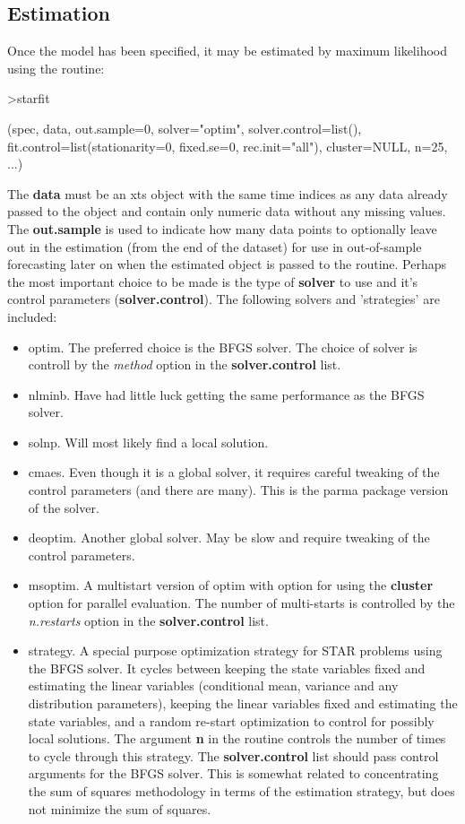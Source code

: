 \subsection{Estimation}
Once the model has been specified, it may be estimated by maximum likelihood
using the  routine:
\begin{Schunk}
\begin{Sinput}
>starfit
\end{Sinput}
\begin{Soutput}
(spec, data, out.sample=0, solver="optim", solver.control=list(), 
fit.control=list(stationarity=0, fixed.se=0, rec.init="all"), 
cluster=NULL, n=25, ...)
\end{Soutput}
\end{Schunk}
The \textbf{data} must be an xts object with the same time indices as any data
already passed to the  object and contain only numeric data
without any missing values. The \textbf{out.sample} is used to indicate how many
data points to optionally leave out in the estimation (from the end of the
dataset) for use in out-of-sample forecasting later on when the estimated object
is passed to the  routine. Perhaps the most important choice
to be made is the type of \textbf{solver} to use and it's control parameters
(\textbf{solver.control}). The following solvers and 'strategies' are included:
\begin{itemize}
  \item optim. The preferred choice is the BFGS solver. The choice of solver is
  controll by the \emph{method} option in the \textbf{solver.control} list.
  \item nlminb. Have had little luck getting the same performance as the BFGS
  solver.
  \item solnp. Will most likely find a local solution.
  \item cmaes. Even though it is a global solver, it requires careful tweaking
  of the control parameters (and there are many). This is the parma package
  version of the solver.
  \item deoptim. Another global solver. May be slow and require tweaking of the
  control parameters.
  \item msoptim. A multistart version of optim with option for using the
  \textbf{cluster} option for parallel evaluation. The number of
  multi-starts is controlled by the \emph{n.restarts} option in the
  \textbf{solver.control} list.
  \item strategy. A special purpose optimization strategy for STAR problems
  using the BFGS solver. It cycles between keeping the state variables fixed and
  estimating the linear variables (conditional mean, variance and any
  distribution parameters), keeping the linear variables fixed and estimating
  the state variables, and a random re-start optimization to control for
  possibly local solutions. The argument \textbf{n} in the routine controls the
  number of times to cycle through this strategy. The \textbf{solver.control}
  list should pass control arguments for the BFGS solver. This is somewhat
  related to concentrating the sum of squares methodology in terms of the
  estimation strategy, but does not minimize the sum of squares.
\end{itemize}
